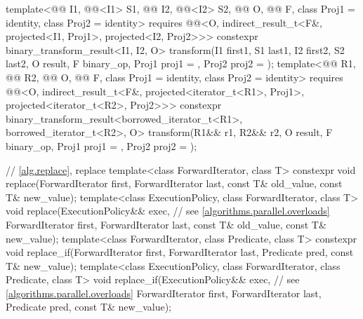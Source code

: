 \begin{codeblock}
{{    template<@@ I1, @@<I1> S1, @@ I2, @@<I2> S2,
             @@ O, @@ F, class Proj1 = identity,
             class Proj2 = identity>
      requires @@<O, indirect_result_t<F&, projected<I1, Proj1>,
                                             projected<I2, Proj2>>>
      constexpr binary_transform_result<I1, I2, O>
        transform(I1 first1, S1 last1, I2 first2, S2 last2, O result,
                  F binary_op, Proj1 proj1 = {}, Proj2 proj2 = {});
    template<@@ R1, @@ R2, @@ O,
             @@ F, class Proj1 = identity, class Proj2 = identity>
      requires @@<O, indirect_result_t<F&, projected<iterator_t<R1>, Proj1>,
                                             projected<iterator_t<R2>, Proj2>>>
      constexpr binary_transform_result<borrowed_iterator_t<R1>, borrowed_iterator_t<R2>, O>
        transform(R1&& r1, R2&& r2, O result,
                  F binary_op, Proj1 proj1 = {}, Proj2 proj2 = {});
  }

  // \ref{alg.replace}, replace
  template<class ForwardIterator, class T>
    constexpr void replace(ForwardIterator first, ForwardIterator last,
                           const T& old_value, const T& new_value);
  template<class ExecutionPolicy, class ForwardIterator, class T>
    void replace(ExecutionPolicy&& exec,                        // see \ref{algorithms.parallel.overloads}
                 ForwardIterator first, ForwardIterator last,
                 const T& old_value, const T& new_value);
  template<class ForwardIterator, class Predicate, class T>
    constexpr void replace_if(ForwardIterator first, ForwardIterator last,
                              Predicate pred, const T& new_value);
  template<class ExecutionPolicy, class ForwardIterator, class Predicate, class T>
    void replace_if(ExecutionPolicy&& exec,                     // see \ref{algorithms.parallel.overloads}
                    ForwardIterator first, ForwardIterator last,
                    Predicate pred, const T& new_value);

}
\end{codeblock}
